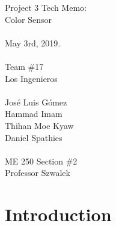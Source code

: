 \documentclass{article}
\begin{document}
\begin{center}
    \Huge{Project 3 Tech Memo: \\ Color Sensor \\~\\}
    \LARGE{  May 3rd, 2019. \\~\\ Team \#17 \\ Los Ingenieros \\~\\ José Luis Gómez \\ Hammad Imam \\ Thihan Moe Kyaw \\ Daniel Spathies \\~\\ ME 250 Section \#2 \\ Professor Szwalek}
\thispagestyle{empty}
\end{center}

\newpage

\tableofcontents
\newpage

\section{Introduction}
\end{document}
